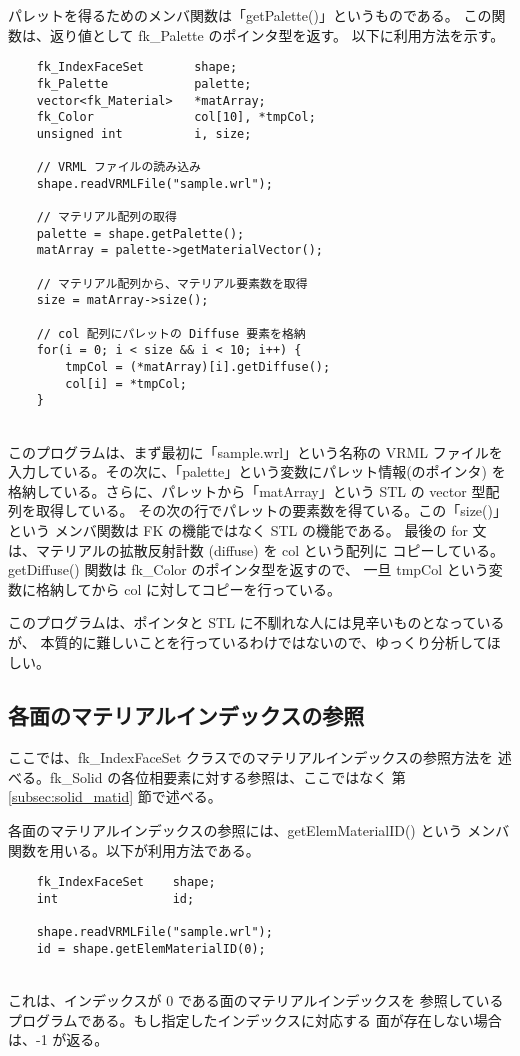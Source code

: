 パレットを得るためのメンバ関数は「getPalette()」というものである。
この関数は、返り値として fk\_Palette のポインタ型を返す。
以下に利用方法を示す。
\\
\begin{breakbox}
\begin{verbatim}
    fk_IndexFaceSet       shape;
    fk_Palette            palette;
    vector<fk_Material>   *matArray;
    fk_Color              col[10], *tmpCol;
    unsigned int          i, size;

    // VRML ファイルの読み込み
    shape.readVRMLFile("sample.wrl");

    // マテリアル配列の取得
    palette = shape.getPalette();
    matArray = palette->getMaterialVector();

    // マテリアル配列から、マテリアル要素数を取得
    size = matArray->size();

    // col 配列にパレットの Diffuse 要素を格納
    for(i = 0; i < size && i < 10; i++) {
        tmpCol = (*matArray)[i].getDiffuse();
        col[i] = *tmpCol;
    }
\end{verbatim}
\end{breakbox}
~ \\
このプログラムは、まず最初に「sample.wrl」という名称の VRML ファイルを
入力している。その次に、「palette」という変数にパレット情報(のポインタ)
を格納している。さらに、パレットから「matArray」という STL の
vector 型配列を取得している。
その次の行でパレットの要素数を得ている。この「size()」という
メンバ関数は FK の機能ではなく STL の機能である。
最後の for 文は、マテリアルの拡散反射計数 (diffuse) を col という配列に
コピーしている。getDiffuse() 関数は fk\_Color のポインタ型を返すので、
一旦 tmpCol という変数に格納してから col に対してコピーを行っている。

このプログラムは、ポインタと STL に不馴れな人には見辛いものとなっているが、
本質的に難しいことを行っているわけではないので、ゆっくり分析してほしい。

\subsection{各面のマテリアルインデックスの参照}
ここでは、fk\_IndexFaceSet クラスでのマテリアルインデックスの参照方法を
述べる。fk\_Solid の各位相要素に対する参照は、ここではなく
第 \ref{subsec:solid_matid} 節で述べる。

各面のマテリアルインデックスの参照には、getElemMaterialID() という
メンバ関数を用いる。以下が利用方法である。
\\
\begin{breakbox}
\begin{verbatim}
    fk_IndexFaceSet    shape;
    int                id;

    shape.readVRMLFile("sample.wrl");
    id = shape.getElemMaterialID(0);
\end{verbatim}
\end{breakbox}
~ \\
これは、インデックスが 0 である面のマテリアルインデックスを
参照しているプログラムである。もし指定したインデックスに対応する
面が存在しない場合は、-1 が返る。

